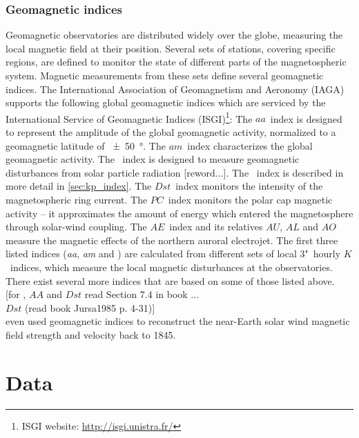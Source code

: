 \subsection{Geomagnetic indices}
\label{sec:geomagnetic_indices}
Geomagnetic observatories are distributed widely over the globe, measuring the local magnetic field at their position. Several sets of stations, covering specific regions, are defined to monitor the state of different parts of the magnetospheric system. Magnetic measurements from these sets define several geomagnetic indices. The International Association of Geomagnetism and Aeronomy (IAGA) supports the following global geomagnetic indices which are serviced by the International Service of Geomagnetic Indices (ISGI)\footnote{ISGI website: \url{http://isgi.unistra.fr/}}:
The $aa$~index is designed to represent the amplitude of the global geomagnetic activity, normalized to a geomagnetic latitude of \SI{+-50}{\degree}. The $am$~index characterizes the global geomagnetic activity. The \Kp{}~index is designed to measure geomagnetic disturbances from solar particle radiation [reword...]. The \Kp~index is described in more detail in \autoref{sec:kp_index}. The $Dst$~index monitors the intensity of the magnetospheric ring current. The $PC$~index monitors the polar cap magnetic activity -- it approximates the amount of energy which entered the magnetosphere through solar-wind coupling. The $AE$~index and its relatives $AU$, $AL$ and $AO$ measure the magnetic effects of the northern auroral electrojet.
The first three listed indices (\textit{aa}, \textit{am} and \Kp{}) are calculated from different sets of local 3"~hourly $K$~indices, which measure the local magnetic disturbances at the observatories. There exist several more indices that are based on some of those listed above.\\

[for \Kp{}, $AA$ and $Dst$ read Section 7.4 in book \citet{Bothmer2007}...\\
$Dst$ (read book Jursa1985 p. 4-31)]\\

\citet{Lockwood2014} even used geomagnetic indices to reconstruct the near-Earth solar wind magnetic field strength and velocity back to 1845.\\




\chapter{Data}
\label{chap:data}

